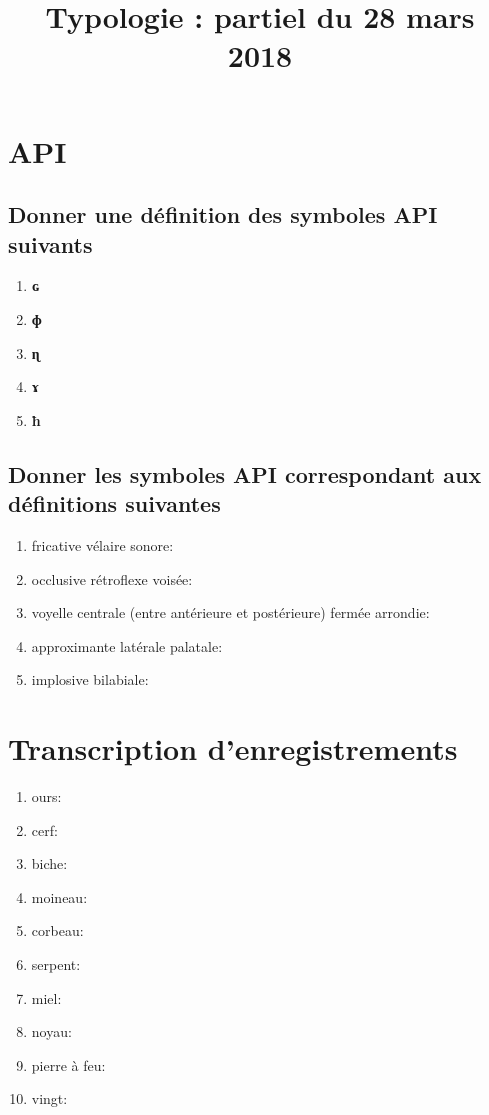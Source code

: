 \documentclass{article}
\newcommand{\ipa}[1]{{\phon\textbf{#1}}}
\begin{document}
\title{Typologie : partiel du 28 mars 2018}
\date{}
\maketitle
 

\section{API}
\subsection{Donner une définition des symboles API suivants}
\begin{enumerate}
\item \ipa{ɢ}
\item \ipa{ɸ}
\item \ipa{ɳ}
\item \ipa{ɤ}
\item \ipa{ħ}
\end{enumerate}
\subsection{Donner les symboles API correspondant aux définitions suivantes}
\begin{enumerate}
\item fricative vélaire sonore:
\item occlusive rétroflexe voisée:
\item voyelle centrale (entre antérieure et postérieure) fermée arrondie:
\item approximante latérale palatale:
\item implosive bilabiale:
\end{enumerate}

\section{Transcription d'enregistrements}
\begin{enumerate}
\item ours: %
\item cerf: %
\item biche: %
\item moineau: %
\item corbeau: %
\item serpent: %
\item miel: %
\item noyau: %
\item pierre à feu: %
\item vingt: %
\end{enumerate}
\end{document}
